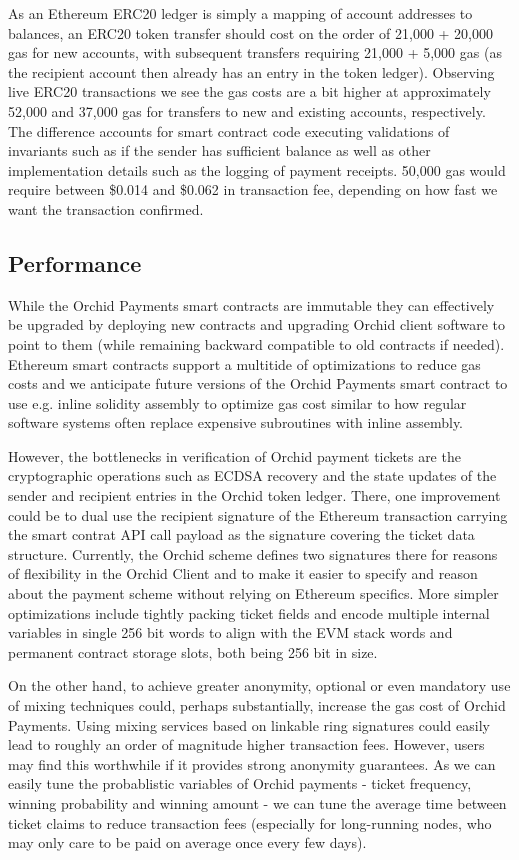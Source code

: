 As an Ethereum ERC20 ledger is simply a mapping of account addresses to balances, an ERC20 token transfer should cost on the order of 21,000 + 20,000 gas for new accounts, with subsequent transfers requiring 21,000 + 5,000 gas (as the recipient account then already has an entry in the token ledger). Observing live\cite{LiveERC20} ERC20 transactions we see the gas costs are a bit higher at approximately 52,000 and 37,000 gas for transfers to new and existing accounts, respectively. The difference accounts for smart contract code executing validations of invariants such as if the sender has sufficient balance as well as other implementation details such as the logging of payment receipts. 50,000 gas would require between \$0.014 and \$0.062 in transaction fee, depending on how fast we want the transaction confirmed.

\subsection{Performance}

While the Orchid Payments smart contracts are immutable they can effectively be upgraded by deploying new contracts and upgrading Orchid client software to point to them (while remaining backward compatible to old contracts if needed). Ethereum smart contracts support a multitide of optimizations to reduce gas costs and we anticipate future versions of the Orchid Payments smart contract to use e.g. inline solidity assembly \cite{SolidityAssembly} to optimize gas cost similar to how regular software systems often replace expensive subroutines with inline assembly.

However, the bottlenecks in verification of Orchid payment tickets are the cryptographic operations such as ECDSA recovery and the state updates of the sender and recipient entries in the Orchid token ledger. There, one improvement could be to dual use the recipient signature of the Ethereum transaction carrying the smart contrat API call payload as the signature covering the ticket data structure. Currently, the Orchid scheme defines two signatures there for reasons of flexibility in the Orchid Client and to make it easier to specify and reason about the payment scheme without relying on Ethereum specifics. More simpler optimizations include tightly packing ticket fields and encode multiple internal variables in single 256 bit words to align with the EVM stack words and permanent contract storage slots, both being 256 bit in size.

On the other hand, to achieve greater anonymity, optional or even mandatory use of mixing techniques could, perhaps substantially, increase the gas cost of Orchid Payments. Using mixing services based on linkable ring signatures could easily lead to roughly an order of magnitude higher transaction fees\cite{ETHRingSigs}. However, users may find this worthwhile if it provides strong anonymity guarantees. As we can easily tune the probablistic variables of Orchid payments - ticket frequency, winning probability and winning amount - we can tune the average time between ticket claims to reduce transaction fees (especially for long-running nodes, who may only care to be paid on average once every few days).

